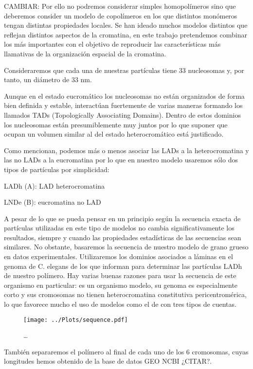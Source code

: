CAMBIAR: Por ello no podremos considerar simples homopolímeros sino que deberemos consider un modelo de copolímeros en los que distintos monómeros tengan distintas propiedades locales. Se han ideado muchos modelos distintos que reflejan distintos aspectos de la cromatina, en este trabajo pretendemos combinar los más importantes con el objetivo de reproducir las características más llamativas de la organización espacial de la cromatina.

Consideraremos que cada una de nuestras partículas tiene 33 nucleosomas y, por tanto, un diámetro de 33 nm.

Aunque en el estado eucromático los nucleosomas no están organizados de forma bien definida y estable, interactúan fuertemente de varias maneras formando los llamados TADs (Topologically Associating Domains). Dentro de estos dominios los nucleosomas están presumiblemente muy juntos por lo que suponer que ocupan un volumen similar al del estado heterocromático está justificado.

Como \cite{Bajpai2021} mencionan, podemos más o menos asociar las LADs a la heterocromatina y las no LADs a la eucromatina por lo que en nuestro modelo usaremos sólo dos tipos de partículas por simplicidad:

LADh (A): LAD heterocromatina

LNDe (B): eucromatina no LAD

A pesar de lo que se pueda pensar en un principio según \cite{Bajpai2021} la secuencia exacta de partículas utilizadas en este tipo de modelos no cambia significativamente los resultados, siempre y cuando las propiedades estadísticas de las secuencias sean similares. No obstante, basaremos la secuencia de nuestro modelo de grano grueso en datos experimentales. Utilizaremos los dominios asociados a láminas en el genoma de C. elegans de los que informan \cite{Ho2014} para determinar las partículas LADh de nuestro polímero. Hay varias buenas razones para usar la secuencia de este organismo en particular: es un organismo modelo, su genoma es especialmente corto y sus cromosomas no tienen heterocromatina constitutiva pericentromérica, lo que favorece mucho el uso de modelos como el de \cite{Falk2019} con tres tipos de cuentas.

\begin{figure}
    \centering
    \texttt{[image: ../Plots/sequence.pdf]}
    \caption{\dots}
    \label{fig:sequence}
\end{figure}

También separaremos el polímero al final de cada uno de los 6 cromosomas, cuyas longitudes hemos obtenido de la base de datos GEO NCBI ¿CITAR?.


